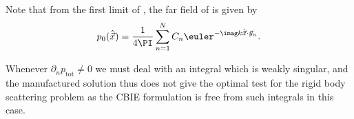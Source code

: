 
Note that from the first limit of , the far field of  is given by
\begin{equation*}
	p_0(\hat{\vec{x}})=\frac{1}{4\PI}\sum_{n=1}^N C_n \euler^{-\imag k \hat{\vec{x}}\cdot\vec{y}_n}.
\end{equation*}

Whenever $\partial_n p_{\mathrm{tot}}\neq 0$ we must deal with an integral which is weakly singular, and the manufactured solution thus does not give the optimal test for the rigid body scattering problem as the CBIE formulation is free from such integrals in this case.

